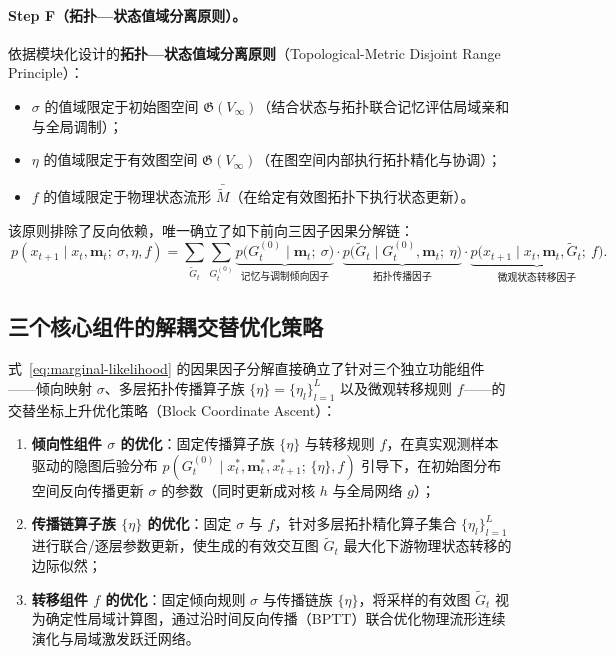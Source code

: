\documentclass[11pt,a4paper]{article}
\numberwithin{equation}{section}
\theoremstyle{definition}
\theoremstyle{remark}
\begin{document}
	\paragraph{Step F（拓扑—状态值域分离原则）。}
	依据模块化设计的\textbf{拓扑—状态值域分离原则}（Topological-Metric Disjoint Range Principle）：
	\begin{itemize}[leftmargin=2em]
		\item $\sigma$ 的值域限定于初始图空间 $\mathfrak{G}(V_\infty)$（结合状态与拓扑联合记忆评估局域亲和与全局调制）；
		\item $\eta$ 的值域限定于有效图空间 $\mathfrak{G}(V_\infty)$（在图空间内部执行拓扑精化与协调）；
		\item $f$ 的值域限定于物理状态流形 $\bar{\widetilde{M}}$（在给定有效图拓扑下执行状态更新）。
	\end{itemize}
	该原则排除了反向依赖，唯一确立了如下前向三因子因果分解链：
	\begin{equation}
		\boxed{\ p(x_{t+1}\mid x_t, \mathbf{m}_t;\ \sigma, \eta, f) = \sum_{\widetilde{G}_t} \sum_{G_t^{(0)}}
			\underbrace{p\bigl(G_t^{(0)}\mid \mathbf{m}_t;\ \sigma\bigr)}_{\text{记忆与调制倾向因子}}
			\cdot
			\underbrace{p\bigl(\widetilde{G}_t\mid G_t^{(0)}, \mathbf{m}_t;\ \eta\bigr)}_{\text{拓扑传播因子}}
			\cdot
			\underbrace{p\bigl(x_{t+1}\mid x_t, \mathbf{m}_t, \widetilde{G}_t;\ f\bigr)}_{\text{微观状态转移因子}}.\ }
		\label{eq:marginal-likelihood}
	\end{equation}
	
	\subsection{\texorpdfstring{三个核心组件的解耦交替优化策略}{三个核心组件的解耦交替优化策略}}
	
	式~\eqref{eq:marginal-likelihood} 的因果因子分解直接确立了针对三个独立功能组件——倾向映射 $\sigma$、多层拓扑传播算子族 $\{\eta\} = \{\eta_l\}_{l=1}^L$ 以及微观转移规则 $f$——的交替坐标上升优化策略（Block Coordinate Ascent）：
	\begin{enumerate}[label=(\arabic*), leftmargin=2.4em]
		\item \textbf{倾向性组件 $\sigma$ 的优化}：固定传播算子族 $\{\eta\}$ 与转移规则 $f$，在真实观测样本驱动的隐图后验分布 $p(G_t^{(0)}\mid x_t^\ast, \mathbf{m}_t^\ast, x_{t+1}^\ast;\, \{\eta\}, f)$ 引导下，在初始图分布空间反向传播更新 $\sigma$ 的参数（同时更新成对核 $h$ 与全局网络 $g$）；
		\item \textbf{传播链算子族 $\{\eta\}$ 的优化}：固定 $\sigma$ 与 $f$，针对多层拓扑精化算子集合 $\{\eta_l\}_{l=1}^L$ 进行联合/逐层参数更新，使生成的有效交互图 $\widetilde{G}_t$ 最大化下游物理状态转移的边际似然；
		\item \textbf{转移组件 $f$ 的优化}：固定倾向规则 $\sigma$ 与传播链族 $\{\eta\}$，将采样的有效图 $\widetilde{G}_t$ 视为确定性局域计算图，通过沿时间反向传播（BPTT）联合优化物理流形连续演化与局域激发跃迁网络。
	\end{enumerate}
	
\end{document}
